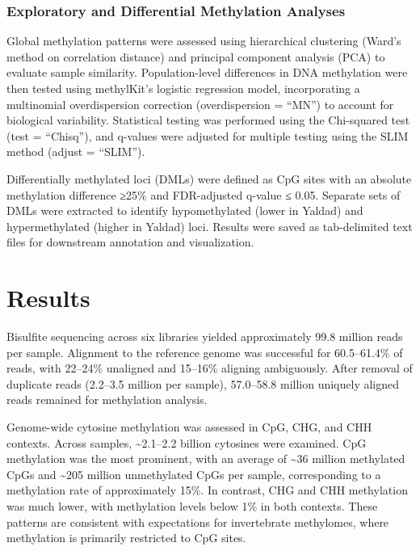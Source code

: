\documentclass[
]{agujournal2019}
\begin{document}
\subsubsection{Exploratory and Differential Methylation
Analyses}\label{exploratory-and-differential-methylation-analyses}

Global methylation patterns were assessed using hierarchical clustering
(Ward's method on correlation distance) and principal component analysis
(PCA) to evaluate sample similarity. Population-level differences in DNA
methylation were then tested using methylKit's logistic regression
model, incorporating a multinomial overdispersion correction
(overdispersion = ``MN'') to account for biological variability.
Statistical testing was performed using the Chi-squared test (test =
``Chisq''), and q-values were adjusted for multiple testing using the
SLIM method (adjust = ``SLIM'').

Differentially methylated loci (DMLs) were defined as CpG sites with an
absolute methylation difference ≥25\% and FDR-adjusted q-value ≤ 0.05.
Separate sets of DMLs were extracted to identify hypomethylated (lower
in Yaldad) and hypermethylated (higher in Yaldad) loci. Results were
saved as tab-delimited text files for downstream annotation and
visualization.

\section{Results}\label{results}

Bisulfite sequencing across six libraries yielded approximately 99.8
million reads per sample. Alignment to the reference genome was
successful for 60.5--61.4\% of reads, with 22--24\% unaligned and
15--16\% aligning ambiguously. After removal of duplicate reads
(2.2--3.5 million per sample), 57.0--58.8 million uniquely aligned reads
remained for methylation analysis.

Genome-wide cytosine methylation was assessed in CpG, CHG, and CHH
contexts. Across samples, \textasciitilde2.1--2.2 billion cytosines were
examined. CpG methylation was the most prominent, with an average of
\textasciitilde36 million methylated CpGs and \textasciitilde205 million
unmethylated CpGs per sample, corresponding to a methylation rate of
approximately 15\%. In contrast, CHG and CHH methylation was much lower,
with methylation levels below 1\% in both contexts. These patterns are
consistent with expectations for invertebrate methylomes, where
methylation is primarily restricted to CpG sites.
\end{document}
